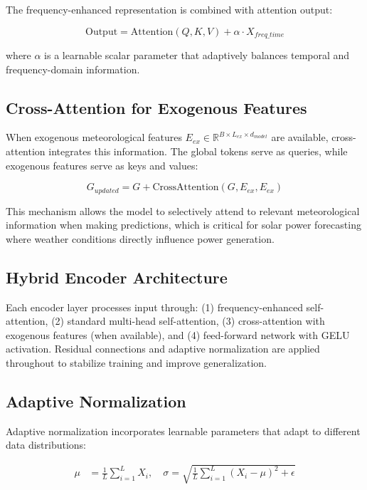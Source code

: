 \documentclass[conference]{IEEEtran}
\begin{document}
The frequency-enhanced representation is combined with attention output:

\begin{equation}
\text{Output} = \text{Attention}(Q, K, V) + \alpha \cdot X_{freq\_time}
\end{equation}

where $\alpha$ is a learnable scalar parameter that adaptively balances temporal and frequency-domain information.

\subsection{Cross-Attention for Exogenous Features}

When exogenous meteorological features $E_{ex} \in \mathbb{R}^{B \times L_{ex} \times d_{model}}$ are available, cross-attention integrates this information. The global tokens serve as queries, while exogenous features serve as keys and values:

\begin{equation}
G_{updated} = G + \text{CrossAttention}(G, E_{ex}, E_{ex})
\end{equation}

This mechanism allows the model to selectively attend to relevant meteorological information when making predictions, which is critical for solar power forecasting where weather conditions directly influence power generation.

\subsection{Hybrid Encoder Architecture}

Each encoder layer processes input through: (1) frequency-enhanced self-attention, (2) standard multi-head self-attention, (3) cross-attention with exogenous features (when available), and (4) feed-forward network with GELU activation. Residual connections and adaptive normalization are applied throughout to stabilize training and improve generalization.

\subsection{Adaptive Normalization}

Adaptive normalization incorporates learnable parameters that adapt to different data distributions:

\begin{align}
\mu &= \frac{1}{L} \sum_{i=1}^{L} X_i, \quad \sigma = \sqrt{\frac{1}{L} \sum_{i=1}^{L} (X_i - \mu)^2 + \epsilon}
\end{align}
\end{document}
